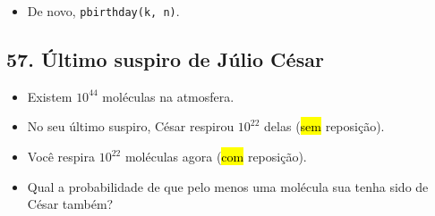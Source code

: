 \documentclass[
  11pt]{report}
\providecommand{\tightlist}{%
  \setlength{\itemsep}{0pt}\setlength{\parskip}{0pt}}
\begin{document}
\begin{itemize}
\tightlist
\item
  De novo, \texttt{pbirthday(k,\ n)}.
\end{itemize}

\hypertarget{uxfaltimo-suspiro-de-juxfalio-cuxe9sar}{%
\subsection*{57. Último suspiro de Júlio César}\label{uxfaltimo-suspiro-de-juxfalio-cuxe9sar}}

\begin{rmdbox}

\begin{itemize}
\item
  Existem $10^{44}$ moléculas na atmosfera.
\item
  No seu último suspiro, César respirou $10^{22}$ delas ({\hl{sem}} reposição).
\item
  Você respira $10^{22}$ moléculas agora ({\hl{com}} reposição).
\item
  Qual a probabilidade de que pelo menos uma molécula sua tenha sido de César também?
\end{itemize}

\end{rmdbox}
\end{document}
